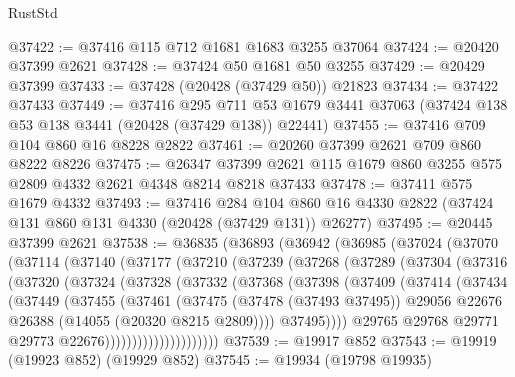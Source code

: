\begin{lexlean}{RustStd}
\begin{coremodule}
@37422 := @37416 @115 @712 @1681 @1683 @3255 @37064
@37424 := @20420 @37399 @2621
@37428 := @37424 @50 @1681 @50 @3255
@37429 := @20429 @37399
@37433 := @37428 (@20428 (@37429 @50)) @21823
@37434 := @37422 @37433
@37449 := @37416
    @295
    @711
    @53
    @1679
    @3441
    @37063
    (@37424 @138 @53 @138 @3441 (@20428 (@37429 @138)) @22441)
@37455 := @37416 @709 @104 @860 @16 @8228 @2822
@37461 := @20260 @37399 @2621 @709 @860 @8222 @8226
@37475 := @26347 @37399 @2621 @115 @1679 @860 @3255 @575 @2809 @4332 @2621 @4348 @8214 @8218 @37433
@37478 := @37411 @575 @1679 @4332
@37493 := @37416
    @284
    @104
    @860
    @16
    @4330
    @2822
    (@37424 @131 @860 @131 @4330 (@20428 (@37429 @131)) @26277)
@37495 := @20445 @37399 @2621
@37538 := @36835
    (@36893
      (@36942
        (@36985
          (@37024
            (@37070
              (@37114
                (@37140
                  (@37177
                    (@37210
                      (@37239
                        (@37268
                          (@37289
                            (@37304
                              (@37316
                                (@37320
                                  (@37324
                                    (@37328
                                      (@37332
                                        (@37368
                                          (@37398
                                            (@37409
                                              (@37414
                                                (@37434
                                                  (@37449
                                                    (@37455
                                                      (@37461
                                                        (@37475
                                                          (@37478 (@37493 @37495))
                                                          @29056
                                                          @22676
                                                          @26388
                                                          (@14055 (@20320 @8215 @2809))))
                                                      @37495))))
                                              @29765
                                              @29768
                                              @29771
                                              @29773
                                              @22676)))))))))))))))))))))
@37539 := @19917 @852
@37543 := @19919 (@19923 @852) (@19929 @852)
@37545 := @19934 (@19798 @19935)

\end{coremodule}
\end{lexlean}
